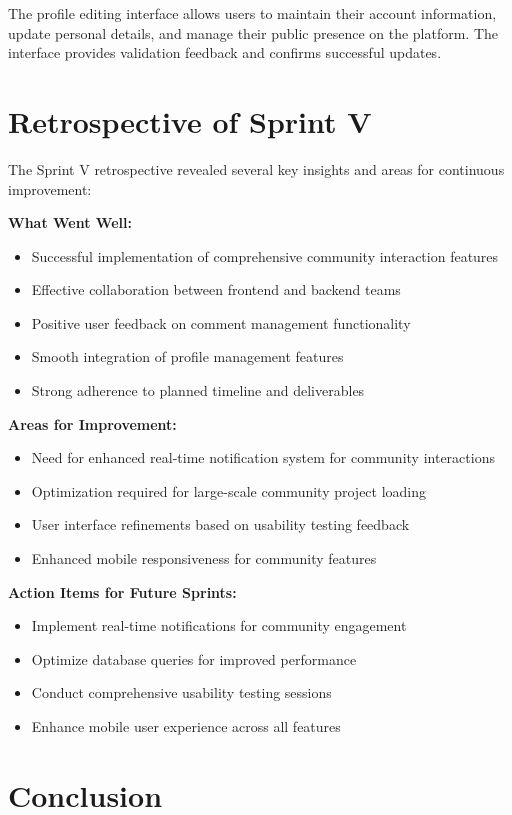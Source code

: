 The profile editing interface allows users to maintain their account information, update personal details, and manage their public presence on the platform. The interface provides validation feedback and confirms successful updates.

\section{Retrospective of Sprint V}

The Sprint V retrospective revealed several key insights and areas for continuous improvement:

\textbf{What Went Well:}
\begin{itemize}
\item Successful implementation of comprehensive community interaction features
\item Effective collaboration between frontend and backend teams
\item Positive user feedback on comment management functionality
\item Smooth integration of profile management features
\item Strong adherence to planned timeline and deliverables
\end{itemize}

\textbf{Areas for Improvement:}
\begin{itemize}
\item Need for enhanced real-time notification system for community interactions
\item Optimization required for large-scale community project loading
\item User interface refinements based on usability testing feedback
\item Enhanced mobile responsiveness for community features
\end{itemize}

\textbf{Action Items for Future Sprints:}
\begin{itemize}
\item Implement real-time notifications for community engagement
\item Optimize database queries for improved performance
\item Conduct comprehensive usability testing sessions
\item Enhance mobile user experience across all features
\end{itemize}

\section{Conclusion}

